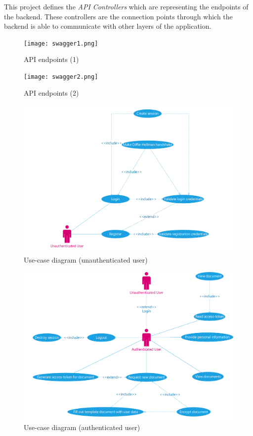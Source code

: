 This project defines the \emph{API Controllers} which are representing the endpoints of the backend.
These controllers are the connection points through which the backend is able to communicate with other layers of the application.

\begin{figure}[H]
	\centering
	\texttt{[image: swagger1.png]}
	\caption{API endpoints (1)}
\end{figure}

\begin{figure}[H]
	\centering
	\texttt{[image: swagger2.png]}
	\caption{API endpoints (2)}
\end{figure}

\begin{figure}[H]
	\centering
	\includegraphics[scale=0.50]{use-case-diagram-unauth}
	\caption{Use-case diagram (unauthenticated user)}
\end{figure}

\begin{figure}[H]
	\centering
	\includegraphics[scale=0.50]{use-case-diagram}
	\caption{Use-case diagram (authenticated user)}
\end{figure}


